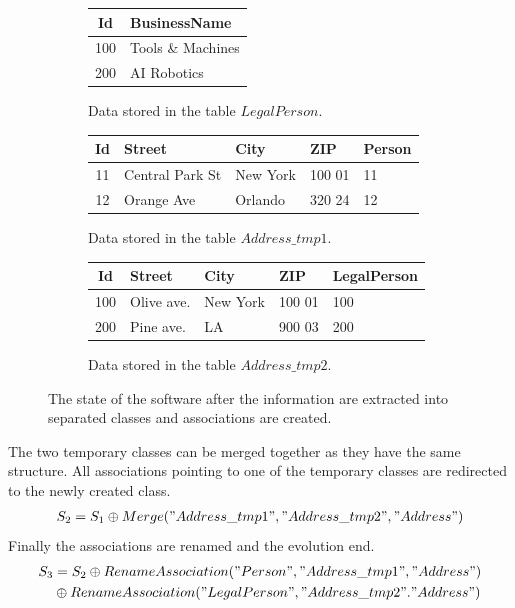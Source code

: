 \documentclass[11pt]{article}
\begin{document}
\begin{figure}
\begin{subfigure}[b]{0.5\textwidth}
\begin{tabular}{| c | l |}
	 	\hline
		Id &  BusinessName  \\ \hline  
		100 & Tools \& Machines  \\ \hline
		200 & AI Robotics \\ \hline
	\end{tabular}
	\caption{Data stored in the table $LegalPerson$.}
\end{subfigure}
\begin{subfigure}[b]{\textwidth}
	\centering
	\begin{tabular}{| c | l | l | l | l |}
	 	\hline
		Id & Street & City & ZIP & Person \\ \hline  
		11 & Central Park St & New York & 100 01 & 11  \\ \hline
		12 & Orange Ave & Orlando & 320 24 & 12 \\ \hline
	\end{tabular}
	\caption{Data stored in the table $Address\_tmp1$.}
\end{subfigure}
\begin{subfigure}[b]{\textwidth}
	\centering
	\begin{tabular}{| c | l | l | l | l |}
	 	\hline
		Id & Street & City & ZIP & LegalPerson\\ \hline  
		100 & Olive ave. & New York & 100 01 & 100 \\ \hline
		200 & Pine ave. & LA & 900 03 & 200  \\ \hline
	\end{tabular}
	\caption{Data stored in the table $Address\_tmp2$.}
\end{subfigure}


	\caption{The state of the software after the information are extracted into separated classes and associations are created.}
	\label{fig:case2}
\end{figure}
The two temporary classes can be merged together as they have the same structure. All associations pointing to one of the temporary classes are redirected to the newly created class.
\begin{align*}
%
%
S_2 &= S_1 \oplus Merge("Address\_tmp1", "Address\_tmp2", "Address") \\
\end{align*}
Finally the associations are renamed and the evolution end.
\begin{align*}
S_3 &= S_2  \oplus RenameAssociation("Person", "Address\_tmp1", "Address")\\
& \oplus RenameAssociation("LegalPerson", "Address\_tmp2". "Address")\\
\end{align*}
\end{document}
